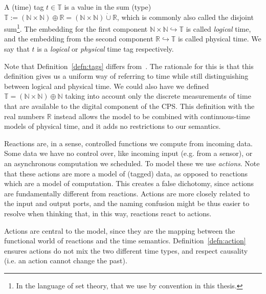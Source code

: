 \begin{defn}[tag]
    \label{defn:tags}
   A (time) tag $t \in \mathbb{T}$ is a value in the sum (type) $\mathbb{T} := (\mathbb{N} \times \mathbb{N}) \oplus \mathbb{R} = (\mathbb{N} \times \mathbb{N}) \dot{\cup} \mathbb{R}$, which is commonly also called the disjoint sum\footnote{In the language of set theory, that we use by convention in this thesis.}.
   The embedding for the first component $\mathbb{N} \times \mathbb{N} \hookrightarrow \mathbb{T}$ is called \emph{logical} time, and the embedding from the second component $\mathbb{R} \hookrightarrow \mathbb{T}$ is called physical time.
   We say that $t$ is a \emph{logical} or \emph{physical} time tag respectively.
\end{defn}

Note that Definition~\ref{defn:tags} differs from~\cite{lohstroh_cyphy19,lohstroh_phdthesis}.
The rationale for this is that this definition gives us a uniform way of referring to time while still distinguishing between logical and physical time.
We could also have we defined $\mathbb{T} = (\mathbb{N} \times \mathbb{N}) \oplus \mathbb{N}$ taking into account only the discrete measurements of time that are available to the digital component of the \ac{CPS}.
This definition with the real numbers $\mathbb{R}$ instead allows the model to be combined with continuous-time models of physical time, and it adds no restrictions to our semantics.

Reactions are, in a sense, controlled functions we compute from incoming data. 
Some data we have no control over, like incoming input (e.g. from a sensor), or an asynchronous computation we scheduled.
To model these we use \emph{actions}.
Note that these actions are more a model of (tagged) data, as opposed to reactions which are a model of computation.
This creates a false dichotomy, since actions are fundamentally different from reactions.
Actions are more closely related to the input and output ports, and the naming confusion might be thus easier to resolve when thinking that, in this way, reactions react to actions.

Actions are central to the model, since they are the mapping between the functional world of reactions and the time semantics. 
Definition~\ref{defn:action} ensures actions do not mix the two different time types, and respect causality (i.e. an action cannot change the past).

